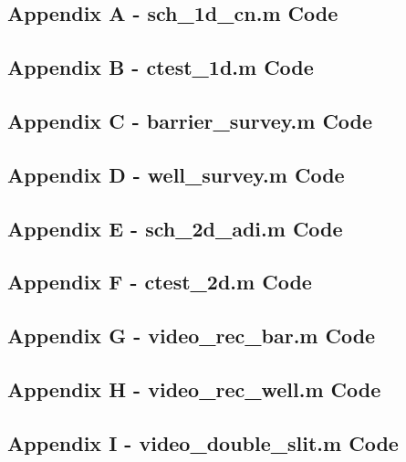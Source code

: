 \documentclass[10pt]{article}
\begin{document}
\subsection*{Appendix A - sch\_1d\_cn.m Code}

\pagebreak

\subsection*{Appendix B - ctest\_1d.m Code}

\pagebreak

\subsection*{Appendix C - barrier\_survey.m Code}

\pagebreak

\subsection*{Appendix D - well\_survey.m Code}

\pagebreak

\subsection*{Appendix E - sch\_2d\_adi.m Code}

\pagebreak

\subsection*{Appendix F - ctest\_2d.m Code}

\pagebreak

\subsection*{Appendix G - video\_rec\_bar.m Code}

\pagebreak

\subsection*{Appendix H - video\_rec\_well.m Code}

\pagebreak

\subsection*{Appendix I - video\_double\_slit.m Code}

\pagebreak
\end{document}
